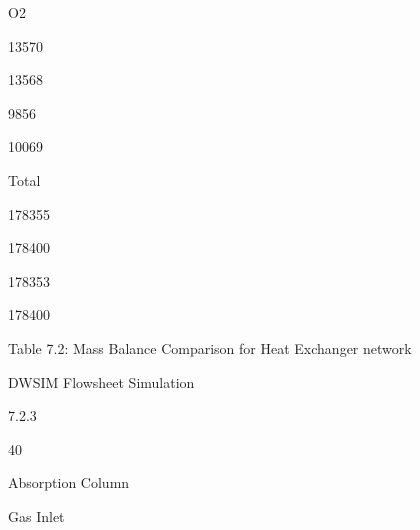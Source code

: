 \documentclass[a4paper,portrait,12pt]{article}
\begin{document}
\begin{flushleft}
O2
\end{flushleft}





13570





13568





9856





10069





\begin{flushleft}
Total
\end{flushleft}





178355





178400





178353





178400





\begin{flushleft}
Table 7.2: Mass Balance Comparison for Heat Exchanger network
\end{flushleft}





\begin{flushleft}
\newpage
DWSIM Flowsheet Simulation
\end{flushleft}





7.2.3





40





\begin{flushleft}
Absorption Column
\end{flushleft}


\begin{flushleft}
Gas Inlet
\end{flushleft}
\end{document}

